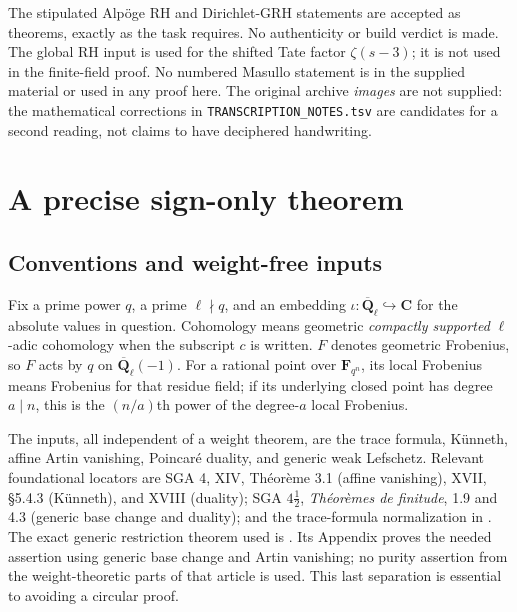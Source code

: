 The stipulated Alp\"oge RH and Dirichlet-GRH statements are accepted as
theorems, exactly as the task requires.  No authenticity or build verdict is
made.  The global RH input is used for the shifted Tate factor
$\zeta(s-3)$; it is not used in the finite-field proof.  No numbered Masullo
statement is in the supplied material or used in any proof here.
The original archive \emph{images} are not supplied: the mathematical
corrections in \texttt{TRANSCRIPTION\_NOTES.tsv} are candidates for a second
reading, not claims to have deciphered handwriting.

\section{A precise sign-only theorem}
\label{sec:sign}

\subsection{Conventions and weight-free inputs}
Fix a prime power $q$, a prime $\ell\nmid q$, and an embedding
$\iota:\overline{\mathbf Q}_\ell\hookrightarrow\mathbf C$ for the
absolute values in question.  Cohomology means geometric \emph{compactly
supported} \(\ell\)-adic cohomology when the subscript $c$ is written.
$F$ denotes geometric Frobenius, so $F$ acts by $q$ on
$\overline{\mathbf Q}_\ell(-1)$.  For a rational point over
$\mathbf F_{q^n}$, its local Frobenius means Frobenius for that residue
field; if its underlying closed point has degree $a\mid n$, this is the
$(n/a)$th power of the degree-$a$ local Frobenius.

The inputs, all independent of a weight theorem, are the trace formula,
K\"unneth, affine Artin vanishing, Poincar\'e duality, and generic weak
Lefschetz.  Relevant foundational locators are SGA 4, XIV, Th\'eor\`eme 3.1
(affine vanishing), XVII, \S5.4.3 (K\"unneth), and XVIII (duality);
SGA $4\frac12$, \emph{Th\'eor\`emes de finitude}, 1.9 and 4.3 (generic
base change and duality); and the trace-formula normalization in
\cite[(1.5.1), (1.5.4), (2.3), (2.14)]{WeilI}.
The exact generic restriction theorem used is
\cite[Theorem 3.4, Corollary 3.4.1, pp.~180--181;
Appendix A.5, pp.~220--221]{KatzACT}.
Its Appendix proves the needed assertion using generic base change and
Artin vanishing; no purity assertion from the weight-theoretic parts of
that article is used.  This last separation is essential to avoiding a
circular proof.

